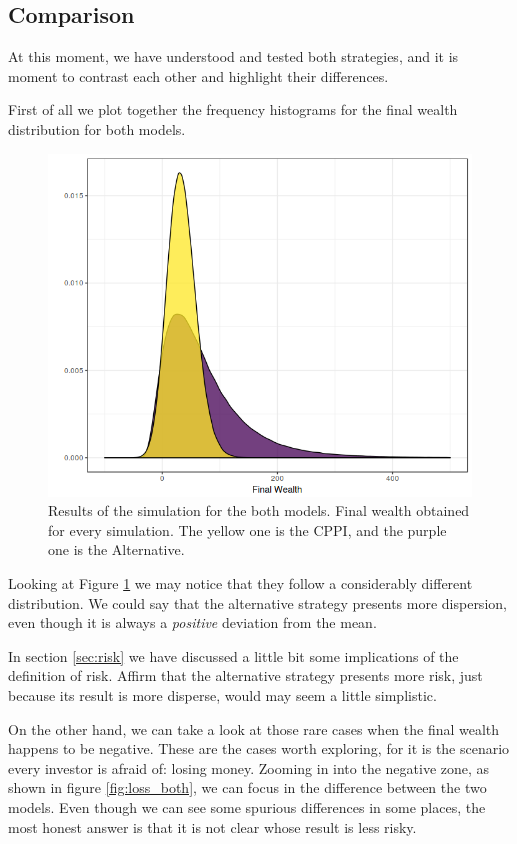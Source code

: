 \subsection{Comparison}

At this moment, we have understood and tested both strategies, and it is moment to contrast each other and highlight their differences.

First of all we plot together the frequency histograms for the final wealth distribution for both models.

\begin{figure}[h]
    \centering
    \includegraphics[scale=0.65]{./images/fw_both.png}
    \caption{Results of the simulation for the both models. Final wealth obtained for every simulation. The yellow one is the CPPI, and the purple one is the Alternative.}
    \label{fig:both_fw}
\end{figure}

Looking at Figure \ref{fig:both_fw} we may notice that they follow a considerably different distribution. We could say that the alternative strategy presents more dispersion, even though it is always a \textit{positive} deviation from the mean.

In section \ref{sec:risk} we have discussed a little bit some implications of the definition of risk. Affirm that the alternative strategy presents more risk, just because its result is more disperse, would may seem a little simplistic.

On the other hand, we can take a look at those rare cases when the final wealth happens to be negative. These are the cases worth exploring, for it is the scenario every investor is afraid of: losing money. Zooming in into the negative zone, as shown in figure \ref{fig:loss_both}, we can focus in the difference between the two models. Even though we can see some spurious differences in some places, the most honest answer is that it is not clear whose result is less risky.

